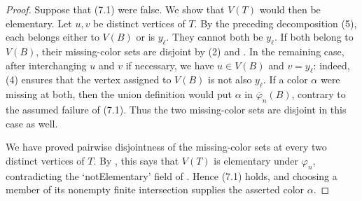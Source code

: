 \begin{proof}
Suppose that (7.1) were false.  We show that $V(T)$ would then be
elementary.  Let $u,v$ be distinct vertices of $T$.  By the preceding
decomposition (5), each belongs either to $V(B)$ or is $y_\ell$.  They cannot
both be $y_\ell$.  If both belong to $V(B)$, their missing-color sets are
disjoint by (2) and .  In the remaining
case, after interchanging $u$ and $v$ if necessary, we have
$u\in V(B)$ and $v=y_\ell$: indeed, (4) ensures that the vertex assigned
to $V(B)$ is not also $y_\ell$.  If a color $\alpha$ were missing at both,
then the union definition  would put
$\alpha$ in $\overline\varphi_n(B)$, contrary to the assumed failure of
(7.1).  Thus the two missing-color sets are disjoint in this case as well.

We have proved pairwise disjointness of the missing-color sets at every
two distinct vertices of $T$.  By
, this says that $V(T)$ is elementary
under $\varphi_n$, contradicting the `notElementary' field of
.  Hence (7.1) holds, and choosing a
member of its nonempty finite intersection supplies the asserted color
$\alpha$.
\end{proof}
